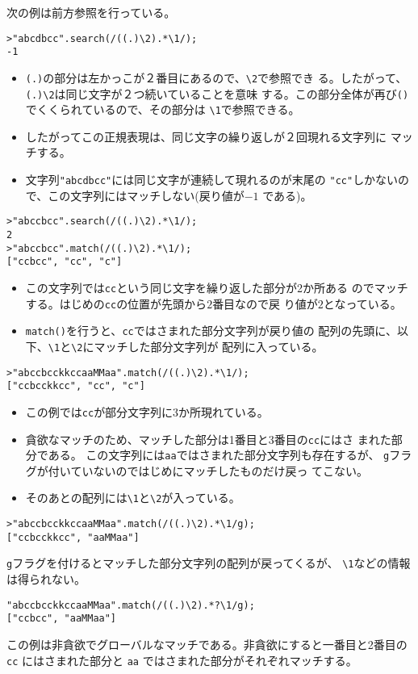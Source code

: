 \begin{Exec}\upshape
次の例は前方参照を行っている。
\begin{verbatim}
>"abcdbcc".search(/((.)\2).*\1/);
-1
\end{verbatim}
\begin{itemize}
 \item \verb+(.)+の部分は左かっこが２番目にあるので、\verb+\2+で参照でき
       る。したがって、\verb+(.)\2+は同じ文字が２つ続いていることを意味
       する。この部分全体が再び\verb+()+でくくられているので、その部分は
       \verb+\1+で参照できる。
 \item したがってこの正規表現は、同じ文字の繰り返しが２回現れる文字列に
       マッチする。
 \item 文字列\verb+"abcdbcc"+には同じ文字が連続して現れるのが末尾の
       \verb+"cc"+しかないので、この文字列にはマッチしない(戻り値が$-1$
       である)。
\end{itemize}
\begin{verbatim}
>"abccbcc".search(/((.)\2).*\1/);
2
>"abccbcc".match(/((.)\2).*\1/);
["ccbcc", "cc", "c"]
\end{verbatim}
\begin{itemize}
 \item この文字列では\verb+cc+という同じ文字を繰り返した部分が2か所ある
       のでマッチする。はじめの\verb+cc+の位置が先頭から$2$番目なので戻
       り値が$2$となっている。
 \item \verb+match()+を行うと、\verb+cc+ではさまれた部分文字列が戻り値の
       配列の先頭に、以下、\verb+\1+と\verb+\2+にマッチした部分文字列が
       配列に入っている。
\end{itemize}
\begin{verbatim}
>"abccbcckkccaaMMaa".match(/((.)\2).*\1/);
["ccbcckkcc", "cc", "c"]
\end{verbatim}
\begin{itemize}
 \item この例では\verb+cc+が部分文字列に3か所現れている。
 \item 貪欲なマッチのため、マッチした部分は1番目と3番目の\verb+cc+にはさ
       まれた部分である。
       この文字列には\verb+aa+ではさまれた部分文字列も存在するが、
       \verb+g+フラグが付いていないのではじめにマッチしたものだけ戻っ
       てこない。
 \item そのあとの配列には\verb+\1+と\verb+\2+が入っている。
\end{itemize}
\begin{verbatim}
>"abccbcckkccaaMMaa".match(/((.)\2).*\1/g);
["ccbcckkcc", "aaMMaa"]
\end{verbatim}
 \verb+g+フラグを付けるとマッチした部分文字列の配列が戻ってくるが、
 \verb+\1+などの情報は得られない。
\begin{verbatim}
"abccbcckkccaaMMaa".match(/((.)\2).*?\1/g);
["ccbcc", "aaMMaa"]
\end{verbatim}
この例は非貪欲でグローバルなマッチである。非貪欲にすると一番目と2番目の
 \verb+cc+ にはさまれた部分と \verb+aa+ ではさまれた部分がそれぞれマッチする。


\end{Exec}
